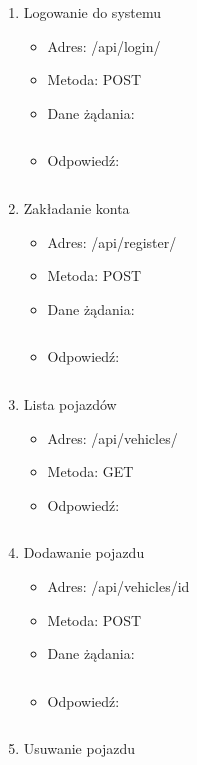 \vspace{0.5cm}

\begin{enumerate}
	\item Logowanie do systemu
	\renewcommand{\labelitemi}{\textperiodcentered}
	\begin{itemize}
		\item Adres: /api/login/
		\item Metoda: POST
		\item Dane żądania:
		\inputminted[fontsize=\footnotesize]{json}{src/api/login.json}
		\item Odpowiedź:
		\inputminted[fontsize=\footnotesize]{json}{src/api/login-response.json}
	\end{itemize}
	\item Zakładanie konta
	\renewcommand{\labelitemi}{\textperiodcentered}
	\begin{itemize}
		\item Adres: /api/register/
		\item Metoda: POST
		\item Dane żądania:
		\inputminted[fontsize=\footnotesize]{json}{src/api/register.json}
		\item Odpowiedź:
		\inputminted[fontsize=\footnotesize]{json}{src/api/register-response.json}
	\end{itemize}
	\item Lista pojazdów
	\renewcommand{\labelitemi}{\textperiodcentered}
	\begin{itemize}
		\item Adres: /api/vehicles/
		\item Metoda: GET
		\item Odpowiedź:
		\inputminted[fontsize=\footnotesize]{json}{src/api/vehicles-response.json}
	\end{itemize}
	\item Dodawanie pojazdu
	\renewcommand{\labelitemi}{\textperiodcentered}
	\begin{itemize}
		\item Adres: /api/vehicles/{{id}}
		\item Metoda: POST
		\item Dane żądania:
		\inputminted[fontsize=\footnotesize]{json}{src/api/vehicles_post.json}
		\item Odpowiedź:
		\inputminted[fontsize=\footnotesize]{json}{src/api/vehicle-created.json}
	\end{itemize}
	\item Usuwanie pojazdu
	\renewcommand{\labelitemi}{\textperiodcentered}

\end{enumerate}
